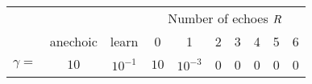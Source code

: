 \begin{tabular*}{\linewidth}{@{\extracolsep{\fill}}lccccccccc@{}}
    \toprule
     &       &          & \multicolumn{7}{c}{{\footnotesize Number of echoes $R$}} \\
     \cmidrule{4-10}
     & anechoic & learn & 0 & 1 & 2 & 3 & 4 & 5 & 6 \\
     \cmidrule{2-10}
     $\gamma = $ & $10$ & $10^{-1}$ & $10$ & $10^{-3}$ & 0 & 0 & 0 & 0 & 0 \\
     \bottomrule
\end{tabular*}